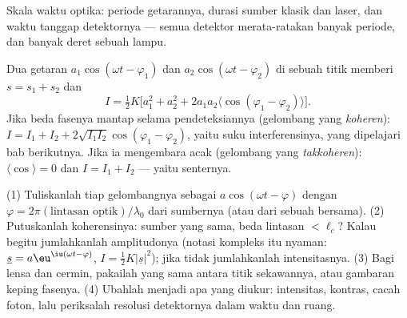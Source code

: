 \begin{omfigure}

{\small Skala waktu optika: periode getarannya, durasi
 sumber klasik dan laser, dan
waktu tanggap detektornya --- semua detektor merata-ratakan banyak
periode, dan banyak deret sebuah lampu.}
\end{omfigure}

\begin{remark}\label{rem:b2:scalar-light-model:superposition}
Dua getaran $a_1\cos(\omega t - \varphi_1)$ dan $a_2\cos(\omega t - \varphi_2)$ di sebuah
titik memberi $s = s_1 + s_2$ dan
\[
I = \tfrac12K\bigl[a_1^2 + a_2^2 + 2a_1a_2\langle\cos(\varphi_1 - \varphi_2)\rangle\bigr] .
\]
Jika beda fasenya mantap selama pendeteksiannya
(gelombang yang \emph{koheren}): $I = I_1 + I_2 + 2\sqrt{I_1I_2}\cos(\varphi_1 - \varphi_2)$,
yaitu suku interferensinya, yang dipelajari bab berikutnya. Jika ia mengembara
acak (gelombang yang \emph{takkoheren}): $\langle\cos\rangle = 0$ dan $I = I_1 +
I_2$ --- yaitu senternya.
\end{remark}

\begin{method}\label{met:b2:scalar-light-model:method}
(1) Tuliskanlah tiap gelombangnya sebagai $a\cos(\omega t - \varphi)$ dengan $\varphi = 2\pi(\text{lintasan optik})/\lambda_0$ dari sumbernya (atau dari sebuah  bersama). (2) Putuskanlah
koherensinya: sumber yang sama, beda lintasan $< \ell_c$? Kalau begitu jumlahkanlah amplitudonya
(notasi kompleks itu nyaman: $\underline s = a\eu^{\iu(\omega t - \varphi)}$, $I =
\tfrac12K|\underline s|^2$); jika tidak jumlahkanlah intensitasnya. (3) Bagi lensa dan
cermin, pakailah  yang sama antara titik sekawannya, atau
gambaran keping fasenya. (4) Ubahlah menjadi apa yang diukur: intensitas,
kontras, cacah foton, lalu periksalah resolusi detektornya dalam waktu
dan ruang.
\end{method}

